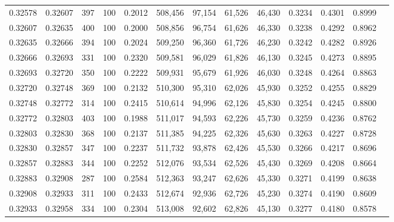 \begin{tabular}{rrrrrrrrrrrrr}
0.32578 & 0.32607 &   397 & 100 &                                     0.2012 & 508,456 &  97,154 &  61,526 &  46,430 & 0.3234 & 0.4301 & 0.8999 \\
0.32607 & 0.32635 &   400 & 100 &                                     0.2000 & 508,856 &  96,754 &  61,626 &  46,330 & 0.3238 & 0.4292 & 0.8962 \\
0.32635 & 0.32666 &   394 & 100 &                                     0.2024 & 509,250 &  96,360 &  61,726 &  46,230 & 0.3242 & 0.4282 & 0.8926 \\
0.32666 & 0.32693 &   331 & 100 &                                     0.2320 & 509,581 &  96,029 &  61,826 &  46,130 & 0.3245 & 0.4273 & 0.8895 \\
0.32693 & 0.32720 &   350 & 100 &                                     0.2222 & 509,931 &  95,679 &  61,926 &  46,030 & 0.3248 & 0.4264 & 0.8863 \\
0.32720 & 0.32748 &   369 & 100 &                                     0.2132 & 510,300 &  95,310 &  62,026 &  45,930 & 0.3252 & 0.4255 & 0.8829 \\
0.32748 & 0.32772 &   314 & 100 &                                     0.2415 & 510,614 &  94,996 &  62,126 &  45,830 & 0.3254 & 0.4245 & 0.8800 \\
0.32772 & 0.32803 &   403 & 100 &                                     0.1988 & 511,017 &  94,593 &  62,226 &  45,730 & 0.3259 & 0.4236 & 0.8762 \\
0.32803 & 0.32830 &   368 & 100 &                                     0.2137 & 511,385 &  94,225 &  62,326 &  45,630 & 0.3263 & 0.4227 & 0.8728 \\
0.32830 & 0.32857 &   347 & 100 &                                     0.2237 & 511,732 &  93,878 &  62,426 &  45,530 & 0.3266 & 0.4217 & 0.8696 \\
0.32857 & 0.32883 &   344 & 100 &                                     0.2252 & 512,076 &  93,534 &  62,526 &  45,430 & 0.3269 & 0.4208 & 0.8664 \\
0.32883 & 0.32908 &   287 & 100 &                                     0.2584 & 512,363 &  93,247 &  62,626 &  45,330 & 0.3271 & 0.4199 & 0.8638 \\
0.32908 & 0.32933 &   311 & 100 &                                     0.2433 & 512,674 &  92,936 &  62,726 &  45,230 & 0.3274 & 0.4190 & 0.8609 \\
0.32933 & 0.32958 &   334 & 100 &                                     0.2304 & 513,008 &  92,602 &  62,826 &  45,130 & 0.3277 & 0.4180 & 0.8578 \\

\end{tabular}
